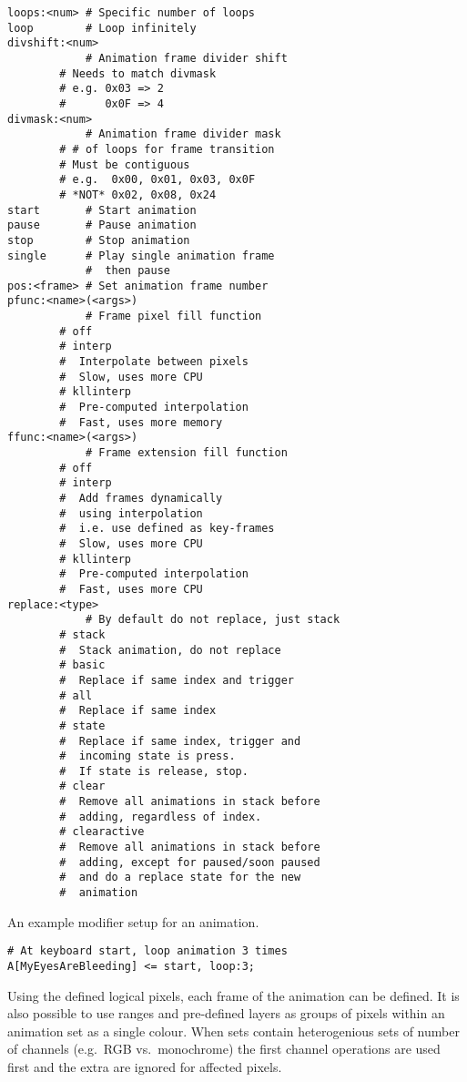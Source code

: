 \documentclass{kiibohd-template}
\begin{document}
\begin{lstlisting}
loops:<num> # Specific number of loops
loop        # Loop infinitely
divshift:<num>
            # Animation frame divider shift
	    # Needs to match divmask
	    # e.g. 0x03 => 2
	    #      0x0F => 4
divmask:<num>
            # Animation frame divider mask
	    # # of loops for frame transition
	    # Must be contiguous
	    # e.g.  0x00, 0x01, 0x03, 0x0F
	    # *NOT* 0x02, 0x08, 0x24
start       # Start animation
pause       # Pause animation
stop        # Stop animation
single      # Play single animation frame
            #  then pause
pos:<frame> # Set animation frame number
pfunc:<name>(<args>)
            # Frame pixel fill function
	    # off
	    # interp
	    #  Interpolate between pixels
	    #  Slow, uses more CPU
	    # kllinterp
	    #  Pre-computed interpolation
	    #  Fast, uses more memory
ffunc:<name>(<args>)
            # Frame extension fill function
	    # off
	    # interp
	    #  Add frames dynamically
	    #  using interpolation
	    #  i.e. use defined as key-frames
	    #  Slow, uses more CPU
	    # kllinterp
	    #  Pre-computed interpolation
	    #  Fast, uses more CPU
replace:<type>
            # By default do not replace, just stack
	    # stack
	    #  Stack animation, do not replace
	    # basic
	    #  Replace if same index and trigger
	    # all
	    #  Replace if same index
	    # state
	    #  Replace if same index, trigger and
	    #  incoming state is press.
	    #  If state is release, stop.
	    # clear
	    #  Remove all animations in stack before
	    #  adding, regardless of index.
	    # clearactive
	    #  Remove all animations in stack before
	    #  adding, except for paused/soon paused
	    #  and do a replace state for the new
	    #  animation
\end{lstlisting}

An example modifier setup for an animation.

\begin{lstlisting}
# At keyboard start, loop animation 3 times
A[MyEyesAreBleeding] <= start, loop:3;
\end{lstlisting}

Using the defined logical pixels, each frame of the animation can be defined.
It is also possible to use ranges and pre-defined layers as groups of pixels within an animation set as a single colour.
When sets contain heterogenious sets of number of channels (e.g.\ RGB vs.\ monochrome) the first channel operations are used first and the extra are ignored for affected pixels.
\end{document}
